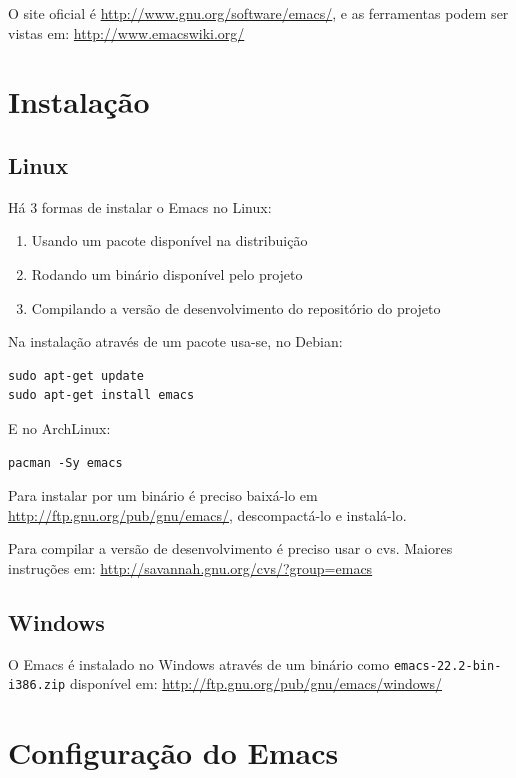 \documentclass[12pt,brazil]{book}
\begin{document}
O site oficial é \url{http://www.gnu.org/software/emacs/}, e as
ferramentas podem ser vistas em: \url{http://www.emacswiki.org/}

\section{Instalação}
\label{sec:instalacao-7}

\subsection{Linux}
\label{sec:linux}

Há 3 formas de instalar o Emacs no Linux:

\begin{enumerate}
\item Usando um pacote disponível na distribuição
\item Rodando um binário disponível pelo projeto
\item Compilando a versão de desenvolvimento do repositório do projeto
\end{enumerate}

Na instalação através de um pacote usa-se, no Debian:

\begin{verbatim}
sudo apt-get update
sudo apt-get install emacs
\end{verbatim}

E no ArchLinux:

\begin{verbatim}
pacman -Sy emacs
\end{verbatim}

Para instalar por um binário é preciso baixá-lo em
\url{http://ftp.gnu.org/pub/gnu/emacs/}, descompactá-lo e instalá-lo.

Para compilar a versão de desenvolvimento é preciso usar o
cvs. Maiores instruções em:
\url{http://savannah.gnu.org/cvs/?group=emacs}

\subsection{Windows}
\label{sec:windows}

O Emacs é instalado no Windows através de um binário como
\texttt{emacs-22.2-bin-i386.zip} disponível em:
\url{http://ftp.gnu.org/pub/gnu/emacs/windows/}

\section{Configuração do Emacs}
\label{sec:conf-do-emacs}
\end{document}

